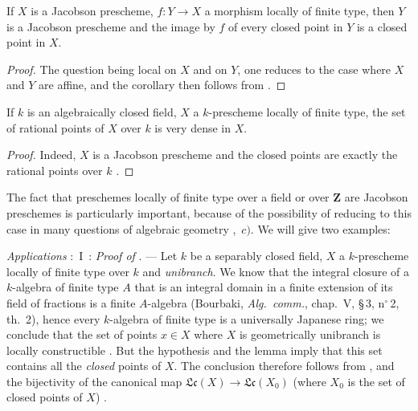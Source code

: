 \begin{corollary}[10.4.7]
\label{IV.10.4.7}
If $X$ is a Jacobson prescheme, $f:Y\to X$ a morphism locally of finite type, then $Y$ is a Jacobson prescheme and the image by $f$ of every closed point in $Y$ is a closed point in $X$.
\end{corollary}

\begin{proof}
The question being local on $X$ and on $Y$, one reduces to the case where $X$ and $Y$ are affine, and the corollary then follows from .
\end{proof}

\begin{corollary}[10.4.8]
\label{IV.10.4.8}
If $k$ is an algebraically closed field, $X$ a $k$-prescheme locally of finite type, the set of rational points of $X$ over $k$ is very dense in $X$.
\end{corollary}

\begin{proof}
Indeed, $X$ is a Jacobson prescheme  and the closed points are exactly the rational points over $k$ .
\end{proof}

\begin{env}[10.4.9]
\label{IV.10.4.9}
The fact that preschemes locally of finite type over a field or over $\mathbf{Z}$ are Jacobson preschemes is particularly important, because of the possibility of reducing to this case in many questions of algebraic geometry ,~$c)$.
We will give two examples:
\end{env}

\begin{env}[10.4.10]
\label{IV.10.4.10}
\emph{Applications} :~I~: \emph{Proof of} . ---
Let $k$ be a separably closed field, $X$ a $k$-prescheme locally of finite type over $k$ and \emph{unibranch}.
We know that the integral closure of a $k$-algebra of finite type $A$ that is an integral domain in a finite extension of its field of fractions is a finite $A$-algebra (Bourbaki, \emph{Alg.\ comm.}, chap.~V, \S\,3, n$^\circ$\,2, th.~2), hence every $k$-algebra of finite type is a universally Japanese ring; we conclude that the set of points $x\in X$ where $X$ is geometrically unibranch is locally constructible .
But the hypothesis and the lemma  imply that this set contains all the \emph{closed} points of $X$.
The conclusion therefore follows from ,  and the bijectivity of the canonical map $\mathfrak{Lc}(X)\to\mathfrak{Lc}(X_0)$ (where $X_0$ is the set of closed points of $X$) .
\end{env}

